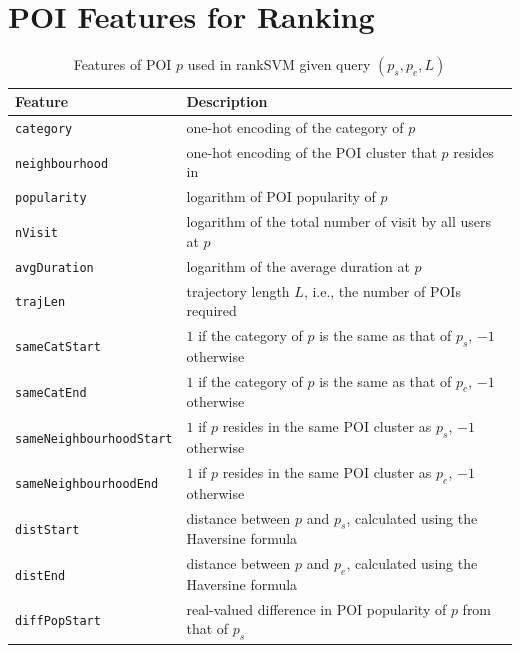 
\onecolumn

\appendix



\section{POI Features for Ranking}

\begin{table}[t]
\caption{Features of POI $p$ used in rankSVM given query $(p_s, p_e, L)$}
\label{tab:featurerank}
\centering
\setlength{\tabcolsep}{10pt} %
\begin{tabular}{l|l} \hline
\textbf{Feature}  & \textbf{Description} \\ \hline
\texttt{category}               & one-hot encoding of the category of $p$ \\
\texttt{neighbourhood}          & one-hot encoding of the POI cluster that $p$ resides in \\
\texttt{popularity}             & logarithm of POI popularity of $p$ \\
\texttt{nVisit}                 & logarithm of the total number of visit by all users at $p$ \\
\texttt{avgDuration}            & logarithm of the average duration at $p$ \\ \hline
\texttt{trajLen}                & trajectory length $L$, i.e., the number of POIs required \\
\texttt{sameCatStart}           & $1$ if the category of $p$ is the same as that of $p_s$, $-1$ otherwise \\
\texttt{sameCatEnd}             & $1$ if the category of $p$ is the same as that of $p_e$, $-1$ otherwise \\
\texttt{sameNeighbourhoodStart} & $1$ if $p$ resides in the same POI cluster as $p_s$, $-1$ otherwise \\
\texttt{sameNeighbourhoodEnd}   & $1$ if $p$ resides in the same POI cluster as $p_e$, $-1$ otherwise \\
\texttt{distStart}              & distance between $p$ and $p_s$, calculated using the Haversine formula \\
\texttt{distEnd}                & distance between $p$ and $p_e$, calculated using the Haversine formula \\
\texttt{diffPopStart}           & real-valued difference in POI popularity of $p$ from that of $p_s$ \\

\end{tabular}
\end{table}
